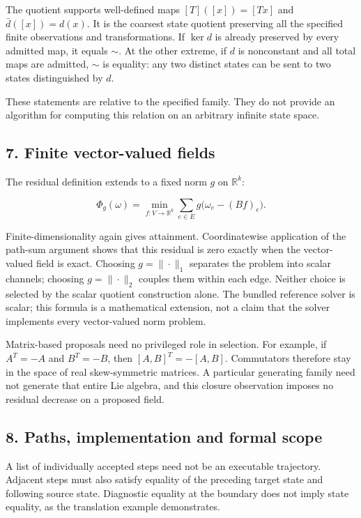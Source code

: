 \documentclass[
]{article}
\begin{document}
The quotient supports well-defined maps \([T]([x])=[Tx]\) and
\(\bar d([x])=d(x)\). It is the coarsest state quotient preserving all
the specified finite observations and transformations. If \(\ker d\) is
already preserved by every admitted map, it equals \(\sim\). At the
other extreme, if \(d\) is nonconstant and all total maps are admitted,
\(\sim\) is equality: any two distinct states can be sent to two states
distinguished by \(d\).

These statements are relative to the specified family. They do not
provide an algorithm for computing this relation on an arbitrary
infinite state space.

\subsection{7. Finite vector-valued
fields}\label{finite-vector-valued-fields}

The residual definition extends to a fixed norm \(g\) on
\(\mathbb R^k\):

\[
\Phi_g(\omega)=\min_{f:V\to\mathbb R^k}
\sum_{e\in E}g\bigl(\omega_e-(Bf)_e\bigr).
\]

Finite-dimensionality again gives attainment. Coordinatewise application
of the path-sum argument shows that this residual is zero exactly when
the vector-valued field is exact. Choosing \(g=\|\cdot\|_1\) separates
the problem into scalar channels; choosing \(g=\|\cdot\|_2\) couples
them within each edge. Neither choice is selected by the scalar quotient
construction alone. The bundled reference solver is scalar; this formula
is a mathematical extension, not a claim that the solver implements
every vector-valued norm problem.

Matrix-based proposals need no privileged role in selection. For
example, if \(A^T=-A\) and \(B^T=-B\), then \([A,B]^T=-[A,B]\).
Commutators therefore stay in the space of real skew-symmetric matrices.
A particular generating family need not generate that entire Lie
algebra, and this closure observation imposes no residual decrease on a
proposed field.

\subsection{8. Paths, implementation and formal
scope}\label{paths-implementation-and-formal-scope}

A list of individually accepted steps need not be an executable
trajectory. Adjacent steps must also satisfy equality of the preceding
target state and following source state. Diagnostic equality at the
boundary does not imply state equality, as the translation example
demonstrates.
\end{document}
